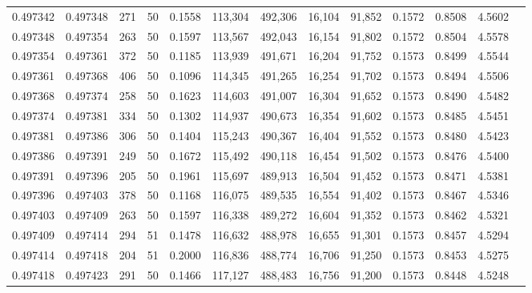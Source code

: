 \begin{tabular}{rrrrrrrrrrrrr}
0.497342 & 0.497348 & 271 &  50 &                                     0.1558 & 113,304 & 492,306 &  16,104 &  91,852 & 0.1572 & 0.8508 & 4.5602 \\
0.497348 & 0.497354 & 263 &  50 &                                     0.1597 & 113,567 & 492,043 &  16,154 &  91,802 & 0.1572 & 0.8504 & 4.5578 \\
0.497354 & 0.497361 & 372 &  50 &                                     0.1185 & 113,939 & 491,671 &  16,204 &  91,752 & 0.1573 & 0.8499 & 4.5544 \\
0.497361 & 0.497368 & 406 &  50 &                                     0.1096 & 114,345 & 491,265 &  16,254 &  91,702 & 0.1573 & 0.8494 & 4.5506 \\
0.497368 & 0.497374 & 258 &  50 &                                     0.1623 & 114,603 & 491,007 &  16,304 &  91,652 & 0.1573 & 0.8490 & 4.5482 \\
0.497374 & 0.497381 & 334 &  50 &                                     0.1302 & 114,937 & 490,673 &  16,354 &  91,602 & 0.1573 & 0.8485 & 4.5451 \\
0.497381 & 0.497386 & 306 &  50 &                                     0.1404 & 115,243 & 490,367 &  16,404 &  91,552 & 0.1573 & 0.8480 & 4.5423 \\
0.497386 & 0.497391 & 249 &  50 &                                     0.1672 & 115,492 & 490,118 &  16,454 &  91,502 & 0.1573 & 0.8476 & 4.5400 \\
0.497391 & 0.497396 & 205 &  50 &                                     0.1961 & 115,697 & 489,913 &  16,504 &  91,452 & 0.1573 & 0.8471 & 4.5381 \\
0.497396 & 0.497403 & 378 &  50 &                                     0.1168 & 116,075 & 489,535 &  16,554 &  91,402 & 0.1573 & 0.8467 & 4.5346 \\
0.497403 & 0.497409 & 263 &  50 &                                     0.1597 & 116,338 & 489,272 &  16,604 &  91,352 & 0.1573 & 0.8462 & 4.5321 \\
0.497409 & 0.497414 & 294 &  51 &                                     0.1478 & 116,632 & 488,978 &  16,655 &  91,301 & 0.1573 & 0.8457 & 4.5294 \\
0.497414 & 0.497418 & 204 &  51 &                                     0.2000 & 116,836 & 488,774 &  16,706 &  91,250 & 0.1573 & 0.8453 & 4.5275 \\
0.497418 & 0.497423 & 291 &  50 &                                     0.1466 & 117,127 & 488,483 &  16,756 &  91,200 & 0.1573 & 0.8448 & 4.5248 \\

\end{tabular}
